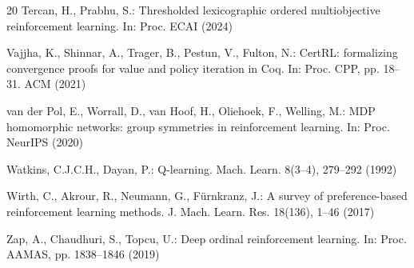 \documentclass[runningheads]{llncs}
\begin{document}
\begin{thebibliography}{20}
Tercan, H., Prabhu, S.: Thresholded lexicographic ordered multiobjective reinforcement learning. In: Proc. ECAI (2024)

Vajjha, K., Shinnar, A., Trager, B., Pestun, V., Fulton, N.: CertRL: formalizing convergence proofs for value and policy iteration in Coq. In: Proc. CPP, pp. 18--31. ACM (2021)

van der Pol, E., Worrall, D., van Hoof, H., Oliehoek, F., Welling, M.: MDP homomorphic networks: group symmetries in reinforcement learning. In: Proc. NeurIPS (2020)

Watkins, C.J.C.H., Dayan, P.: Q-learning. Mach. Learn. 8(3--4), 279--292 (1992)

Wirth, C., Akrour, R., Neumann, G., F{\"u}rnkranz, J.: A survey of preference-based reinforcement learning methods. J. Mach. Learn. Res. 18(136), 1--46 (2017)

Zap, A., Chaudhuri, S., Topcu, U.: Deep ordinal reinforcement learning. In: Proc. AAMAS, pp. 1838--1846 (2019)

\end{thebibliography}
\end{document}
